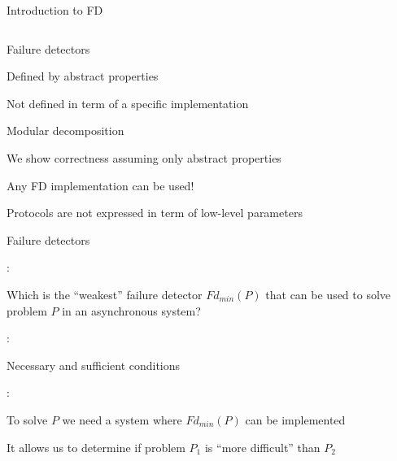 \begin{frame}{Introduction to FD}
\begin{overprint}
\begin{columns}[t]
\begin{column}{0.35\textwidth}
\end{column}
\end{columns}

\end{overprint}
\end{frame}

% 
% 
% 



\begin{frame}{Failure detectors}


\BIL
\item Defined by abstract properties
\BI
\item Not defined in term of a specific implementation
\EI
\item Modular decomposition
\BI
\item We show correctness assuming only abstract properties
\item Any FD implementation can be used!
\item Protocols are not expressed in term of low-level parameters
\EI
\EIL

\end{frame}

\begin{frame}{Failure detectors}
	
:

Which is the “weakest” failure detector $\mathit{Fd}_{\mathit{min}}(P)$ that
can be used to solve problem $P$ in an asynchronous system?

\bigskip
{}:
\BI
\item Necessary and sufficient conditions
\EI

\bigskip
{}: 
\BI
\item To solve $P$ we need a system where $\mathit{Fd}_{\mathit{min}}(P)$ can be implemented
\item It allows us to determine if problem $P_1$ is “more difficult” than $P_2$
\EI

\end{frame}

